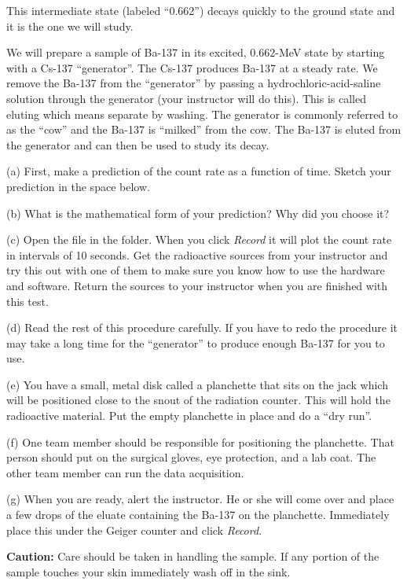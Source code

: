 This intermediate state (labeled ``0.662'') decays quickly to the ground state and
it is the one we will study.

We will prepare a sample of Ba-137 in its excited, 0.662-MeV state 
by starting with a Cs-137 ``generator''.
The Cs-137 produces
Ba-137 at a steady rate. We remove the Ba-137 from the ``generator''
by passing a hydrochloric-acid-saline solution through the generator
(your instructor will do this). This is called eluting which means separate by
washing. The generator is commonly referred to as the ``cow''
and the Ba-137 is ``milked'' from the cow.
The Ba-137 is eluted from the generator and can then be used to study its
decay.


(a) First, make a prediction of the count rate as a function of time.
Sketch your prediction in the space below.
\answerspace{1.3in}

(b) What is the mathematical form of your prediction? Why did you choose it?
\answerspace{1.3in}

\pagebreak[2]
(c) Open the  file in the \filename{\coursefolder} folder. 
When you click \textit{Record}
it will plot the count rate in intervals of 10 seconds.
Get the radioactive sources from your instructor and
try this out with one of them
to make sure you know how to use the hardware and software.
Return the sources to your instructor when you are finished with this test.

(d) Read the rest of this procedure carefully. 
If you have to redo the procedure it may take a long time for the ``generator'' to
produce enough Ba-137 for you to use.

(e) You have a small, metal disk called a planchette that sits on the 
jack which will be positioned close to the snout of the radiation counter.
This will hold the radioactive material.
Put the empty planchette in place and do a ``dry run''.

(f) One team member should be responsible for positioning the planchette.
That person should put on the surgical gloves, eye protection, and a lab coat.
The other team member can run the data acquisition.

(g) When you are ready, alert the instructor. He or she will come over and place 
a few drops of the eluate containing the Ba-137 on the planchette.
Immediately place this under the Geiger counter and
click \textit{Record}.

{\bf Caution:} Care should be taken in handling the sample.
If any portion of the sample touches your skin immediately wash off in the sink.

